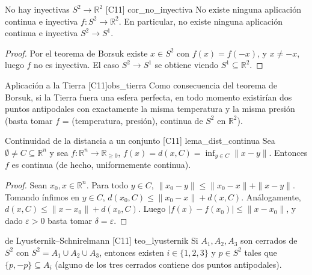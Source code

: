 \begin{proposicion}{No hay inyectivas $S^2 \to \mathbb{R}^2$ [C11] \marcaC}{cor_no_inyectiva}
No existe ninguna aplicación continua e inyectiva $f \colon S^2 \to \mathbb{R}^2$. En particular, no existe ninguna aplicación continua e inyectiva $S^2 \to S^1$.
\end{proposicion}

\begin{proof}
Por el teorema de Borsuk existe $x \in S^2$ con $f(x) = f(-x)$, y $x \neq -x$, luego $f$ no es inyectiva. El caso $S^2 \to S^1$ se obtiene viendo $S^1 \subseteq \mathbb{R}^2$.
\end{proof}

\begin{observacion}{Aplicación a la Tierra [C11]}{obs_tierra}
Como consecuencia del teorema de Borsuk, si la Tierra fuera una esfera perfecta, en todo momento existirían dos puntos antipodales con exactamente la misma temperatura y la misma presión (basta tomar $f$ = (temperatura, presión), continua de $S^2$ en $\mathbb{R}^2$).
\end{observacion}

\begin{proposicion}{Continuidad de la distancia a un conjunto [C11] \marcaL}{lema_dist_continua}
Sea $\emptyset \neq C \subseteq \mathbb{R}^n$ y sea $f \colon \mathbb{R}^n \to \mathbb{R}_{\geq 0}$, $f(x) = d(x,C) = \inf_{y \in C} \|x - y\|$. Entonces $f$ es continua (de hecho, uniformemente continua).
\end{proposicion}

\begin{proof}
Sean $x_0, x \in \mathbb{R}^n$. Para todo $y \in C$, $\|x_0 - y\| \leq \|x_0 - x\| + \|x - y\|$. Tomando ínfimos en $y \in C$, $d(x_0,C) \leq \|x_0 - x\| + d(x,C)$. Análogamente, $d(x,C) \leq \|x - x_0\| + d(x_0,C)$. Luego $|f(x) - f(x_0)| \leq \|x - x_0\|$, y dado $\varepsilon > 0$ basta tomar $\delta = \varepsilon$.
\end{proof}

\begin{teorema}{de Lyusternik--Schnirelmann [C11] \marcaC}{teo_lyusternik}
Si $A_1, A_2, A_3$ son cerrados de $S^2$ con $S^2 = A_1 \cup A_2 \cup A_3$, entonces existen $i \in \{1,2,3\}$ y $p \in S^2$ tales que $\{p,-p\} \subseteq A_i$ (alguno de los tres cerrados contiene dos puntos antipodales).
\end{teorema}

